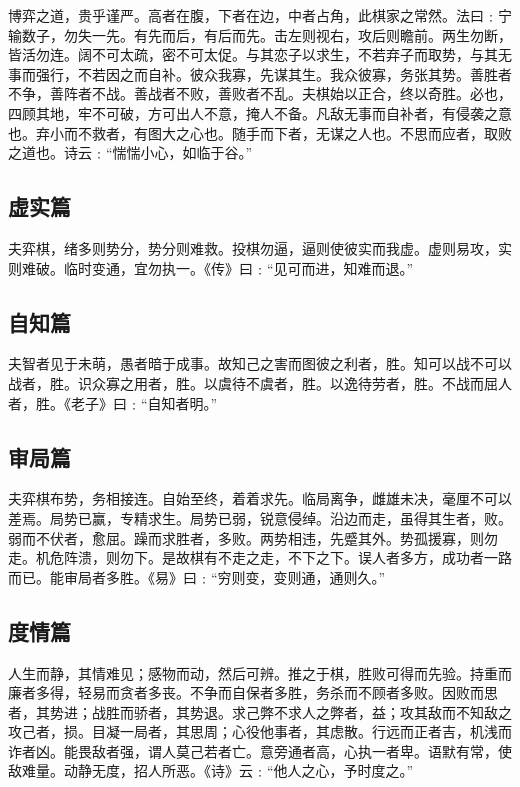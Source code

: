 \documentclass[]{article}
\begin{document}
博弈之道，贵乎谨严。高者在腹，下者在边，中者占角，此棋家之常然。法曰﹕宁输数子，勿失一先。有先而后，有后而先。击左则视右，攻后则瞻前。两生勿断，皆活勿连。阔不可太疏，密不可太促。与其恋子以求生，不若弃子而取势，与其无事而强行，不若因之而自补。彼众我寡，先谋其生。我众彼寡，务张其势。善胜者不争，善阵者不战。善战者不败，善败者不乱。夫棋始以正合，终以奇胜。必也，四顾其地，牢不可破，方可出人不意，掩人不备。凡敌无事而自补者，有侵袭之意也。弃小而不救者，有图大之心也。随手而下者，无谋之人也。不思而应者，取败之道也。诗云﹕``惴惴小心，如临于谷。''

\hypertarget{header-n163}{%
\subsection{虚实篇}\label{header-n163}}

夫弈棋，绪多则势分，势分则难救。投棋勿逼，逼则使彼实而我虚。虚则易攻，实则难破。临时变通，宜勿执一。《传》曰﹕``见可而进，知难而退。''

\hypertarget{header-n167}{%
\subsection{自知篇}\label{header-n167}}

夫智者见于未萌，愚者暗于成事。故知己之害而图彼之利者，胜。知可以战不可以战者，胜。识众寡之用者，胜。以虞待不虞者，胜。以逸待劳者，胜。不战而屈人者，胜。《老子》曰﹕``自知者明。''

\hypertarget{header-n171}{%
\subsection{审局篇}\label{header-n171}}

夫弈棋布势，务相接连。自始至终，着着求先。临局离争，雌雄未决，毫厘不可以差焉。局势已赢，专精求生。局势已弱，锐意侵绰。沿边而走，虽得其生者，败。弱而不伏者，愈屈。躁而求胜者，多败。两势相违，先蹙其外。势孤援寡，则勿走。机危阵溃，则勿下。是故棋有不走之走，不下之下。误人者多方，成功者一路而已。能审局者多胜。《易》曰﹕``穷则变，变则通，通则久。''

\hypertarget{header-n175}{%
\subsection{度情篇}\label{header-n175}}

人生而静，其情难见；感物而动，然后可辨。推之于棋，胜败可得而先验。持重而廉者多得，轻易而贪者多丧。不争而自保者多胜，务杀而不顾者多败。因败而思者，其势进；战胜而骄者，其势退。求己弊不求人之弊者，益；攻其敌而不知敌之攻己者，损。目凝一局者，其思周；心役他事者，其虑散。行远而正者吉，机浅而诈者凶。能畏敌者强，谓人莫己若者亡。意旁通者高，心执一者卑。语默有常，使敌难量。动静无度，招人所恶。《诗》云﹕``他人之心，予时度之。''
\end{document}
